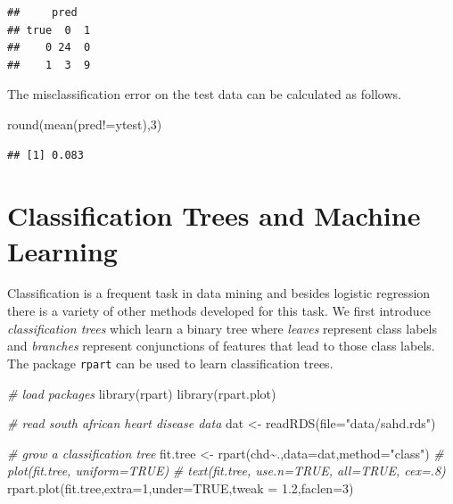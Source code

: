\documentclass[
]{book}
\newenvironment{Shaded}{\begin{snugshade}}{\end{snugshade}}
\newcommand{\AttributeTok}[1]{\textcolor[rgb]{0.77,0.63,0.00}{#1}}
\newcommand{\CommentTok}[1]{\textcolor[rgb]{0.56,0.35,0.01}{\textit{#1}}}
\newcommand{\ConstantTok}[1]{\textcolor[rgb]{0.00,0.00,0.00}{#1}}
\newcommand{\DecValTok}[1]{\textcolor[rgb]{0.00,0.00,0.81}{#1}}
\newcommand{\FloatTok}[1]{\textcolor[rgb]{0.00,0.00,0.81}{#1}}
\newcommand{\FunctionTok}[1]{\textcolor[rgb]{0.00,0.00,0.00}{#1}}
\newcommand{\NormalTok}[1]{#1}
\newcommand{\OtherTok}[1]{\textcolor[rgb]{0.56,0.35,0.01}{#1}}
\newcommand{\SpecialCharTok}[1]{\textcolor[rgb]{0.00,0.00,0.00}{#1}}
\newcommand{\StringTok}[1]{\textcolor[rgb]{0.31,0.60,0.02}{#1}}
\begin{document}
\begin{verbatim}
##     pred
## true  0  1
##    0 24  0
##    1  3  9
\end{verbatim}

The misclassification error on the test data can be calculated as follows.

\begin{Shaded}
\begin{Highlighting}[]
\FunctionTok{round}\NormalTok{(}\FunctionTok{mean}\NormalTok{(pred}\SpecialCharTok{!=}\NormalTok{ytest),}\DecValTok{3}\NormalTok{)}
\end{Highlighting}
\end{Shaded}

\begin{verbatim}
## [1] 0.083
\end{verbatim}

\hypertarget{classification-trees-and-machine-learning}{%
\section{Classification Trees and Machine Learning}\label{classification-trees-and-machine-learning}}

Classification is a frequent task in data mining and besides logistic regression there is a variety of other methods developed for this task. We first introduce \emph{classification trees} which learn a binary tree where \emph{leaves} represent class labels and \emph{branches} represent conjunctions of features that lead to those class labels. The package \texttt{rpart} can be used to learn classification trees.

\begin{Shaded}
\begin{Highlighting}[]
\CommentTok{\# load packages}
\FunctionTok{library}\NormalTok{(rpart)}
\FunctionTok{library}\NormalTok{(rpart.plot)}

\CommentTok{\# read south african heart disease data}
\NormalTok{dat }\OtherTok{\textless{}{-}} \FunctionTok{readRDS}\NormalTok{(}\AttributeTok{file=}\StringTok{"data/sahd.rds"}\NormalTok{)}

\CommentTok{\# grow a classification tree}
\NormalTok{fit.tree }\OtherTok{\textless{}{-}} \FunctionTok{rpart}\NormalTok{(chd}\SpecialCharTok{\textasciitilde{}}\NormalTok{.,}\AttributeTok{data=}\NormalTok{dat,}\AttributeTok{method=}\StringTok{"class"}\NormalTok{)}
\CommentTok{\# plot(fit.tree, uniform=TRUE)}
\CommentTok{\# text(fit.tree, use.n=TRUE, all=TRUE, cex=.8)}
\FunctionTok{rpart.plot}\NormalTok{(fit.tree,}\AttributeTok{extra=}\DecValTok{1}\NormalTok{,}\AttributeTok{under=}\ConstantTok{TRUE}\NormalTok{,}\AttributeTok{tweak =} \FloatTok{1.2}\NormalTok{,}\AttributeTok{faclen=}\DecValTok{3}\NormalTok{)}
\end{Highlighting}
\end{Shaded}
\end{document}
